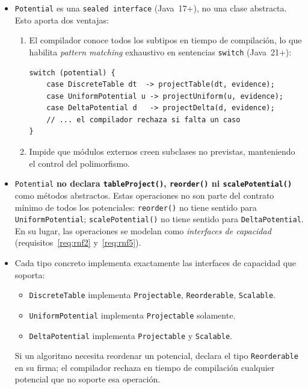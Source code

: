 \documentclass[11pt,a4paper]{article}
\newcommand{\code}[1]{\texttt{#1}}
\begin{document}
\begin{itemize}
  \item \code{Potential} es una \code{sealed interface} (Java~17+), no una
        clase abstracta.  Esto aporta dos ventajas:
        \begin{enumerate}
          \item El compilador conoce todos los subtipos en tiempo de
                compilación, lo que habilita \emph{pattern matching} exhaustivo
                en sentencias \code{switch} (Java~21+):
\begin{lstlisting}
switch (potential) {
    case DiscreteTable dt  -> projectTable(dt, evidence);
    case UniformPotential u -> projectUniform(u, evidence);
    case DeltaPotential d   -> projectDelta(d, evidence);
    // ... el compilador rechaza si falta un caso
}
\end{lstlisting}
          \item Impide que módulos externos creen subclases no previstas,
                manteniendo el control del polimorfismo.
        \end{enumerate}

  \item \code{Potential} \textbf{no declara \code{tableProject()},
        \code{reorder()} ni \code{scalePotential()}} como métodos
        abstractos.  Estas operaciones no son parte del contrato mínimo
        de todos los potenciales: \code{reorder()} no tiene sentido para
        \code{UniformPotential}; \code{scalePotential()} no tiene sentido
        para \code{DeltaPotential}.  En su lugar, las operaciones se
        modelan como \emph{interfaces de capacidad} (requisitos~\ref{req:rnf2}
        y~\ref{req:rnf5}).

  \item Cada tipo concreto implementa exactamente las interfaces de capacidad
        que soporta:
        \begin{itemize}
          \item \code{DiscreteTable} implementa \code{Projectable},
                \code{Reorderable}, \code{Scalable}.
          \item \code{UniformPotential} implementa \code{Projectable} solamente.
          \item \code{DeltaPotential} implementa \code{Projectable} y
                \code{Scalable}.
        \end{itemize}
        Si un algoritmo necesita reordenar un potencial, declara el tipo
        \code{Reorderable} en su firma; el compilador rechaza en tiempo de
        compilación cualquier potencial que no soporte esa operación.
\end{itemize}
\end{document}
